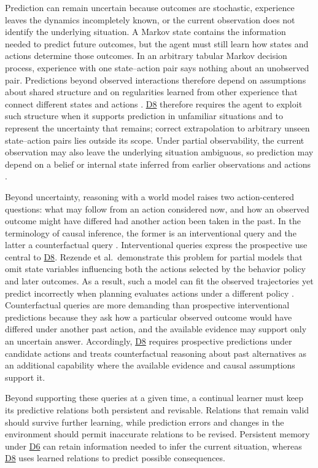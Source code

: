 \documentclass[10pt,journal,compsoc]{IEEEtran}
\DeclareRobustCommand{\Dref}[1]{\hyperref[sec:d#1]{D#1}}
\begin{document}
Prediction can remain uncertain because outcomes are stochastic, experience leaves the dynamics incompletely known, or the current observation does not identify the underlying situation.
A Markov state contains the information needed to predict future outcomes, but the agent must still learn how states and actions determine those outcomes.
In an arbitrary tabular Markov decision process, experience with one state--action pair says nothing about an unobserved pair.
Predictions beyond observed interactions therefore depend on assumptions about shared structure and on regularities learned from other experience that connect different states and actions \cite{young2023}.
\Dref{8} therefore requires the agent to exploit such structure when it supports prediction in unfamiliar situations and to represent the uncertainty that remains; correct extrapolation to arbitrary unseen state--action pairs lies outside its scope.
Under partial observability, the current observation may also leave the underlying situation ambiguous, so prediction may depend on a belief or internal state inferred from earlier observations and actions \cite{kaelbling1998}.

Beyond uncertainty, reasoning with a world model raises two action-centered questions: what may follow from an action considered now, and how an observed outcome might have differed had another action been taken in the past.
In the terminology of causal inference, the former is an interventional query and the latter a counterfactual query \cite{pearl2010,pearl2018}.
Interventional queries express the prospective use central to \Dref{8}.
Rezende et al.\ demonstrate this problem for partial models that omit state variables influencing both the actions selected by the behavior policy and later outcomes.
As a result, such a model can fit the observed trajectories yet predict incorrectly when planning evaluates actions under a different policy \cite{rezende2020}.
Counterfactual queries are more demanding than prospective interventional predictions because they ask how a particular observed outcome would have differed under another past action, and the available evidence may support only an uncertain answer.
Accordingly, \Dref{8} requires prospective predictions under candidate actions and treats counterfactual reasoning about past alternatives as an additional capability where the available evidence and causal assumptions support it.

Beyond supporting these queries at a given time, a continual learner must keep its predictive relations both persistent and revisable.
Relations that remain valid should survive further learning, while prediction errors and changes in the environment should permit inaccurate relations to be revised.
Persistent memory under \Dref{6} can retain information needed to infer the current situation, whereas \Dref{8} uses learned relations to predict possible consequences.
\end{document}
